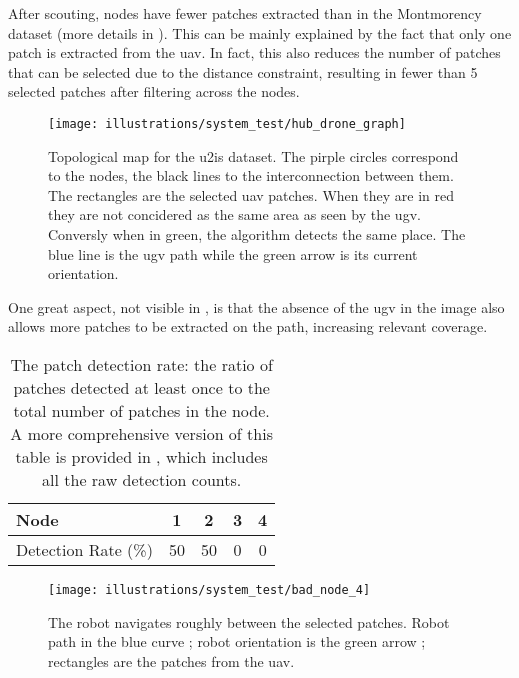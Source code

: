 After scouting, nodes have fewer patches extracted than in the Montmorency dataset (more details in ).
This can be mainly explained by the fact that only one patch is extracted from the \gls{uav}.
In fact, this also reduces the number of patches that can be selected due to the distance constraint, resulting
in fewer than 5 selected patches after filtering across the nodes.

\begin{figure}[ht!]
    \centering
    \texttt{[image: illustrations/system\_test/hub\_drone\_graph]}
    \caption{Topological map for the \gls{u2is} dataset. The pirple circles correspond to the nodes, the black lines to the
    interconnection between them. The rectangles are the selected \gls{uav} patches. When they are
    in red they are not concidered as the same area as seen by the \gls{ugv}. Conversly when in green, the algorithm
    detects the same place. The blue line is the \gls{ugv} path while the green arrow is its current orientation.}
    \label{fig:system_test:hub_drone:graph}
\end{figure}
One great aspect, not visible in , is that the absence of the \gls{ugv} in the image also allows more patches
to be extracted on the path, increasing relevant coverage.

\begin{table}[ht!]
    \centering
    \begin{tabular}{|l|c|c|c|c|}
        \hline
        Node                & 1  & 2  & 3 & 4 \\ \hline
        Detection Rate (\%) & 50 & 50 & 0 & 0 \\ \hline
    \end{tabular}
    \caption{The patch detection rate: the ratio of patches detected at least once to the total number of patches in the node.
    A more comprehensive version of this table is provided in , which includes all the raw detection counts.}
    \label{tab:hub_drone:patch_detection}
\end{table}

\begin{wrapfigure}{r}{0.50\textwidth}
    \begin{center}
        \texttt{[image: illustrations/system\_test/bad\_node\_4]}
    \end{center}
    \caption{The robot navigates roughly between the selected patches. Robot path in the blue curve ; robot orientation
    is the green arrow ; rectangles are the patches from the \gls{uav}.}
    \label{fig:hub_drone:bad_node_4}
\end{wrapfigure}

